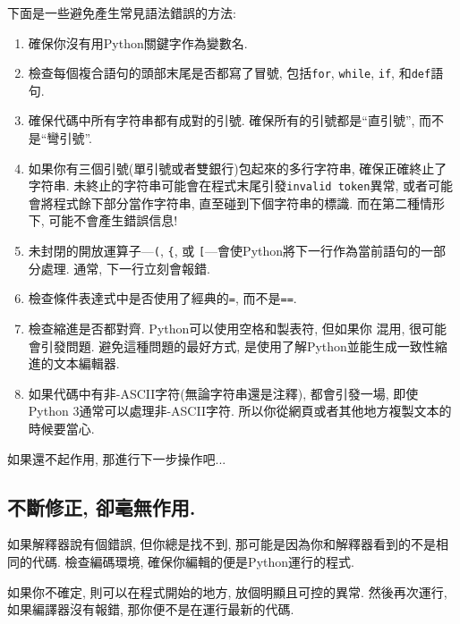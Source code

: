 \documentclass[10pt]{book}
\begin{document}
下面是一些避免產生常見語法錯誤的方法:

\begin{enumerate}

\item 確保你沒有用Python關鍵字作為變數名. 

\item 檢查每個複合語句的頭部末尾是否都寫了冒號, 包括{\tt for}, {\tt while},
{\tt if}, 和{\tt def}語句. 

\item 確保代碼中所有字符串都有成對的引號. 確保所有的引號都是``直引號'', 而不是``彎引號''. 

\item 如果你有三個引號(單引號或者雙銀行)包起來的多行字符串, 確保正確終止了字符串. 
未終止的字符串可能會在程式末尾引發{\tt invalid token}異常, 
或者可能會將程式餘下部分當作字符串, 直至碰到下個字符串的標識. 
而在第二種情形下, 可能不會產生錯誤信息!

\item 未封閉的開放運算子---\verb+(+, \verb+{+, 或
\verb+[+---會使Python將下一行作為當前語句的一部分處理. 
通常, 下一行立刻會報錯. 

\item 檢查條件表達式中是否使用了經典的{\tt =}, 而不是{\tt ==}.

\item 檢查縮進是否都對齊. Python可以使用空格和製表符, 但如果你
混用, 很可能會引發問題. 
避免這種問題的最好方式, 是使用了解Python並能生成一致性縮進的文本編輯器. 

\item 如果代碼中有非-ASCII字符(無論字符串還是注釋), 都會引發一場, 
即使Python 3通常可以處理非-ASCII字符. 
所以你從網頁或者其他地方複製文本的時候要當心. 

\end{enumerate}

如果還不起作用, 那進行下一步操作吧...


\subsection{不斷修正, 卻毫無作用.}

如果解釋器說有個錯誤, 但你總是找不到, 
那可能是因為你和解釋器看到的不是相同的代碼. 
檢查編碼環境, 確保你編輯的便是Python運行的程式. 

如果你不確定, 則可以在程式開始的地方, 放個明顯且可控的異常. 
然後再次運行, 如果編譯器沒有報錯, 那你便不是在運行最新的代碼. 
\end{document}
